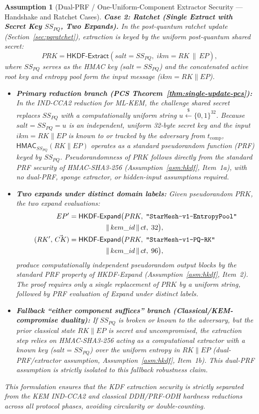 \documentclass[11pt,a4paper]{article}
\theoremstyle{remark}
\theoremstyle{plain}
\newtheorem{assumption}[theorem]{Assumption}
\newcommand{\bits}{\{0,1\}}
\newcommand{\getsr}{\stackrel{\$}{\leftarrow}}
\newcommand{\HKDFExtract}{\mathsf{HKDF\text{-}Extract}}
\newcommand{\HKDFExpand}{\mathsf{HKDF\text{-}Expand}}
\newcommand{\HMAC}{\mathsf{HMAC}}
\newcommand{\strlit}[1]{\text{\upshape\texttt{"#1"}}}
\begin{document}
\begin{assumption}[Dual-PRF / One-Uniform-Component Extractor Security — Handshake and Ratchet Cases]
\medskip\noindent
\textbf{Case 2: Ratchet (Single Extract with Secret Key $SS_{PQ}$, Two Expands).}
In the post-quantum ratchet update (Section~\ref{sec:pqratchet}), extraction is keyed by the uniform post-quantum shared secret:
\[
  PRK = \HKDFExtract(salt = SS_{PQ},\; ikm = RK \,\|\, EP),
\]
where $SS_{PQ}$ serves as the HMAC key ($salt = SS_{PQ}$) and the concatenated active root key and entropy pool form the input message ($ikm = RK \| EP$).
\begin{itemize}
  \item \textbf{Primary reduction branch (PCS Theorem~\ref{thm:single-update-pcs}):}
        In the IND-CCA2 reduction for ML-KEM, the challenge shared secret replaces $SS_{PQ}$ with a
        computationally uniform string $u \getsr \bits^{32}$.  Because $salt = SS_{PQ} = u$ is an independent, uniform 32-byte secret key and the input $ikm = RK \| EP$ is known to or tracked by the adversary from $t_{\mathrm{comp}}$, $\HMAC_{SS_{PQ}}(RK \| EP)$ operates as a standard pseudorandom function (PRF) keyed by $SS_{PQ}$.  Pseudorandomness of $PRK$ follows directly from the standard PRF security of HMAC-SHA3-256 (Assumption~\ref{asm:hkdf}, Item~1a), with no dual-PRF, sponge extractor, or hidden-input assumptions required.
  \item \textbf{Two expands under distinct domain labels:}
        Given pseudorandom $PRK$, the two expand evaluations:
        \begin{align*}
          EP' &= \HKDFExpand\bigl(PRK,\; \strlit{StarMesh-v1-EntropyPool} \\
              &\qquad\qquad\quad\;\|\, kem\_id \,\|\, ct,\; 32\bigr), \\
          (RK',\, \vec{CK}) &= \HKDFExpand\bigl(PRK,\; \strlit{StarMesh-v1-PQ-RK} \\
                            &\qquad\qquad\quad\;\|\, kem\_id \,\|\, ct,\; 96\bigr),
        \end{align*}
        produce computationally independent pseudorandom output blocks by the standard PRF property of HKDF-Expand (Assumption~\ref{asm:hkdf}, Item~2).  The proof requires only a single replacement of $PRK$ by a uniform string, followed by PRF evaluation of Expand under distinct labels.
  \item \textbf{Fallback ``either component suffices'' branch (Classical/KEM-compromise duality):}
        If $SS_{PQ}$ is broken or known to the adversary, but the prior classical state $RK \| EP$ is secret and uncompromised, the extraction step relies on HMAC-SHA3-256 acting as a computational extractor with a known key ($salt = SS_{PQ}$) over the uniform entropy in $RK \| EP$ (dual-PRF/extractor assumption, Assumption~\ref{asm:hkdf}, Item~1b).  This dual-PRF assumption is strictly isolated to this fallback robustness claim.
\end{itemize}

\medskip\noindent
This formulation ensures that the KDF extraction security is strictly separated from the KEM IND-CCA2
and classical DDH/PRF-ODH hardness reductions across all protocol phases, avoiding circularity or
double-counting.
\end{assumption}
\end{document}
